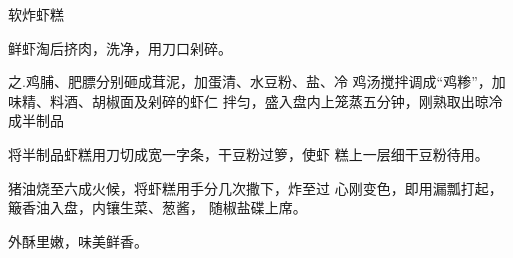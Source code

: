 \begin{recipe}{软炸虾糕}

\ingredients


\cooking

\step 鲜虾淘后挤肉，洗净，用刀口剁碎。

之.鸡脯、肥膘分别砸成茸泥，加蛋清、水豆粉、盐、冷 鸡汤搅拌调成“鸡糁”，加味精、料酒、胡椒面及剁碎的虾仁 拌匀，盛入盘内上笼蒸五分钟，刚熟取出晾冷成半制品

\step 	将半制品虾糕用刀切成宽一字条，干豆粉过箩，使虾 糕上一层细干豆粉待用。

\step 	猪油烧至六成火候，将虾糕用手分几次撒下，炸至过 心刚变色，即用漏瓢打起，簸香油入盘，内镶生菜、葱酱， 随椒盐碟上席。

\notes

外酥里嫩，味美鲜香。

\end{recipe}

